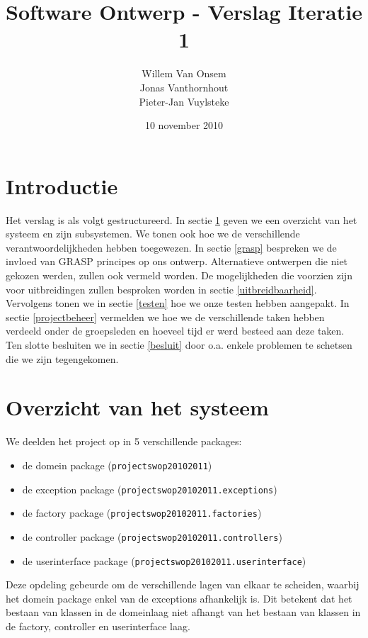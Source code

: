 \documentclass[a4paper, titlepage,12pt]{article}
\title{Software Ontwerp - Verslag Iteratie 1}
\author{Willem Van Onsem\\Jonas Vanthornhout\\Pieter-Jan Vuylsteke}
\date{10 november 2010}
\begin{document}
\begin{titlepage}
\maketitle
\end{titlepage}

\tableofcontents
\newpage
\section*{Introductie}
Het verslag is als volgt gestructureerd. In sectie \ref{overzicht} geven we een overzicht van het systeem en zijn subsystemen.
We tonen ook hoe we de verschillende verantwoordelijkheden hebben toegewezen.
In sectie \ref{grasp} bespreken we de invloed van GRASP principes op ons ontwerp.
Alternatieve ontwerpen die niet gekozen werden, zullen ook vermeld worden.
De mogelijkheden die voorzien zijn voor uitbreidingen zullen besproken worden in sectie \ref{uitbreidbaarheid}.
Vervolgens tonen we in sectie \ref{testen} hoe we onze testen hebben aangepakt.
In sectie \ref{projectbeheer} vermelden we hoe we de verschillende taken hebben verdeeld onder de groepsleden
en hoeveel tijd er werd besteed aan deze taken.
Ten slotte besluiten we in sectie \ref{besluit} door o.a. enkele problemen te schetsen die we zijn tegengekomen.

\newpage
\section{Overzicht van het systeem}
\label{overzicht}
We deelden het project op in 5 verschillende packages:
\begin{itemize}
 \item de domein package (\verb+projectswop20102011+)
 \item de exception package (\verb+projectswop20102011.exceptions+)
 \item de factory package (\verb+projectswop20102011.factories+)
 \item de controller package (\verb+projectswop20102011.controllers+)
 \item de userinterface package (\verb+projectswop20102011.userinterface+)
\end{itemize}
Deze opdeling gebeurde om de verschillende lagen van elkaar te scheiden, waarbij het domein package enkel van de exceptions afhankelijk is. Dit betekent dat het bestaan van klassen in de domeinlaag niet afhangt van het bestaan van klassen in de factory, controller en userinterface laag.
\end{document}
